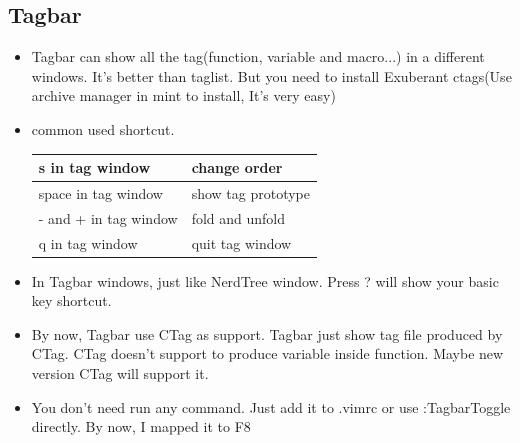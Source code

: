 \documentclass[a4paper,12pt,twoside]{book}
\begin{document}
\subsection{Tagbar}
\begin{itemize}
\item Tagbar can show all the tag(function, variable and macro...) in a different windows. It's better than taglist. But you need to install Exuberant ctags(Use archive manager in mint to install, It's very easy)

\item common used shortcut.	\\	
\begin{tabular}{|p{}|p{}|}
\hline 
s in tag window & change order \\ 
\hline 
space in tag window & show tag prototype  \\ 
\hline 
- and + in tag window & fold and unfold \\ 
\hline 
q in tag window & quit tag window \\ 
\hline 
\end{tabular}
\item In Tagbar windows, just like NerdTree window. Press ? will show your basic key shortcut. 
\item By now, Tagbar use CTag as support. Tagbar just show tag file produced by CTag. CTag doesn't support to produce variable inside function. Maybe new version CTag will support it. 
\item You don't need run any command. Just add it to .vimrc or use :TagbarToggle directly. By now, I mapped it to F8
\end{itemize}
\end{document}
